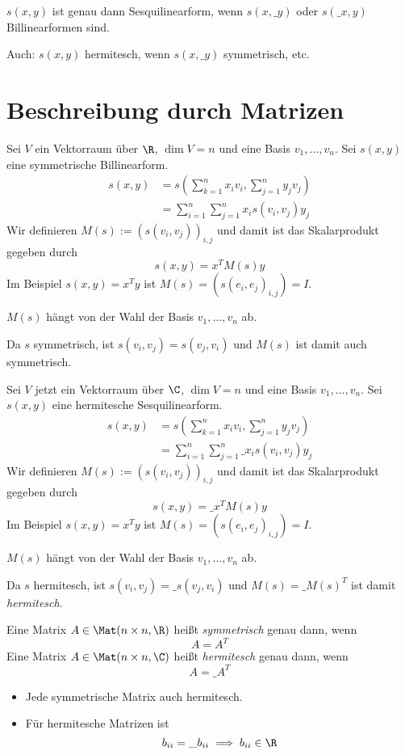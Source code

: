 \documentclass[a4paper, 10pt]{scrbook}
\begin{document}
\begin{note}
	$s(x,y)$ ist genau dann Sesquilinearform, wenn $s(x,\_y)$ oder $s(\_x,y)$ Billinearformen sind.

	Auch: $s(x,y)$ hermitesch, wenn $s(x,\_y)$ symmetrisch, etc.
\end{note}


\section{Beschreibung durch Matrizen}


Sei $V$ ein Vektorraum über $\R$, $\dim V=n$ und eine Basis $v_1,\dotsc, v_n$.
Sei $s(x,y)$ eine symmetrische Billinearform.
\begin{align*}
	s(x,y) &= s\left(\sum_{k=1}^nx_iv_i, \sum_{j=1}^ny_jv_j\right) \\
					   &= \sum_{i=1}^n\sum_{j=1}^n x_i s(v_i,v_j) y_j
\end{align*}
Wir definieren $M(s) := (s(v_i,v_j))_{i,j}$ und damit ist das Skalarprodukt gegeben durch
\[
	s(x,y) = x^T M(s) y
\]
Im Beispiel $s(x,y) = x^Ty$ ist $M(s) = (s(e_i,e_j)_{i,j}) = I$.

$M(s)$ hängt von der Wahl der Basis $v_1,\dotsc, v_n$ ab.

Da $s$ symmetrisch, ist $s(v_i,v_j) = s(v_j,v_i)$ und $M(s)$ ist damit auch symmetrisch.


Sei $V$ jetzt ein Vektorraum über $\C$, $\dim V=n$ und eine Basis $v_1,\dotsc, v_n$.
Sei $s(x,y)$ eine hermitesche Sesquilinearform.
\begin{align*}
	s(x,y) &= s(\sum_{k=1}^nx_iv_i, \sum_{j=1}^ny_jv_j) \\
					   &= \sum_{i=1}^n\sum_{j=1}^n \_{x_i} s(v_i,v_j) y_j
\end{align*}
Wir definieren $M(s) := (s(v_i,v_j))_{i,j}$ und damit ist das Skalarprodukt gegeben durch
\[
	s(x,y) = \_x^T M(s) y
\]
Im Beispiel $s(x,y) = x^Ty$ ist $M(s) = (s(e_i,e_j)_{i,j}) = I$.

$M(s)$ hängt von der Wahl der Basis $v_1,\dotsc, v_n$ ab.

Da $s$ hermitesch, ist $s(v_i,v_j) = \_{s(v_j,v_i)}$ und $M(s) = \_{M(s)}^T$ ist damit \emph{hermitesch}.


\begin{df}
	\label{df:13.3}
	Eine Matrix $A\in \Mat(n\times n,\R)$ heißt \emph{symmetrisch} genau dann, wenn
	\[
		A = A^T
	\]
	Eine Matrix $A\in \Mat(n\times n,\C)$ heißt \emph{hermitesch} genau dann, wenn
	\[
		A = \_A^T
	\]
	\begin{note}
		\begin{itemize}
			\item
				Jede symmetrische Matrix auch hermitesch.
			\item
				Für hermitesche Matrizen ist
				\[
					b_{ii} = \_{b_{ii}} \implies b_{ii} \in \R
				\]
		\end{itemize}
	\end{note}
\end{df}
\end{document}
